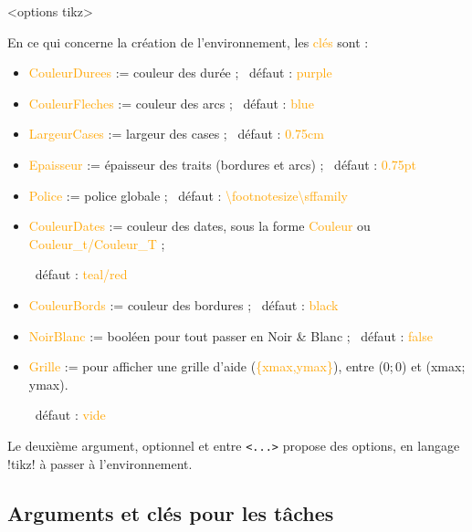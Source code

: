 \documentclass[french,a4paper,11pt]{article}
\newcommand\Cle[1]{{\small\sffamily\textlangle \textcolor{orange}{#1}\textrangle}}
\begin{document}
{{\begin{DemoCode}
\begin{GrapheMPM}[clés]<options tikz>
\end{GrapheMPM}
\end{DemoCode}

\begin{tipblock}
En ce qui concerne la création de l'environnement, les \Cle{clés} sont :

\begin{itemize}
	\item \Cle{CouleurDurees} := couleur des durée ; \hfill~défaut : \Cle{purple}
	\item \Cle{CouleurFleches} := couleur des arcs ; \hfill~défaut : \Cle{blue}
	\item \Cle{LargeurCases} := largeur des cases ; \hfill~défaut : \Cle{0.75cm}
	\item \Cle{Epaisseur} := épaisseur des traits (bordures et arcs) ; \hfill~défaut : \Cle{0.75pt}
	\item \Cle{Police} := police globale ; \hfill~défaut : \Cle{\textbackslash footnotesize\textbackslash sffamily}
	\item \Cle{CouleurDates} := couleur des dates, sous la forme \Cle{Couleur} ou \Cle{Couleur\_t/Couleur\_T} ;

	\hfill~défaut : \Cle{teal/red}
	\item \Cle{CouleurBords} := couleur des bordures ; \hfill~défaut : \Cle{black}
	\item \Cle{NoirBlanc} := booléen pour tout passer en Noir \&{} Blanc ; \hfill~défaut : \Cle{false}
	\item \Cle{Grille} := pour afficher une grille d'aide (\Cle{\{xmax,ymax\}}), entre (0;\,0) et (xmax;\,ymax).

	\hfill~défaut : \Cle{vide}
\end{itemize}

Le deuxième argument, optionnel et entre \texttt{<...>} propose des options, en langage \packagetex!tikz! à passer à l'environnement.
\end{tipblock}

\begin{DemoCode}[]
\begin{GrapheMPM}[Grille={14,5}]
\end{GrapheMPM}
\end{DemoCode}

\pagebreak

\subsection{Arguments et clés pour les tâches}

}}
\end{document}
